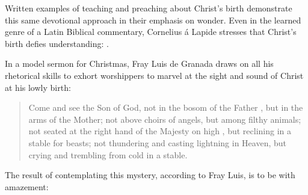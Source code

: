 \documentclass[12pt]{book}
\begin{document}
Written examples of teaching and preaching about Christ's birth demonstrate this
same devotional approach in their emphasis on wonder.
Even in the learned genre of a Latin Biblical commentary, Cornelius á Lapide
stresses that Christ's birth defies understanding: 
.%
    \Autocite
    [50, on Mt 1:15: 
    .]
    {Lapide:Gospels19C}

In a model sermon for Christmas, Fray Luis de Granada draws on all his
rhetorical skills to exhort worshippers to marvel at the sight and sound of
Christ at his lowly birth:
\begin{quote}
    Come and see the Son of God, not in the bosom of the Father , but
    in the arms of the Mother; not above choirs of angels, but among filthy
    animals; not seated at the right hand of the Majesty on high ,
    but reclining in a stable for beasts; not thundering and casting lightning
    in Heaven, but crying and trembling from cold in a stable.
        \Autocite
        [37: .]
        {LuisdeGranada:Xmas}
\end{quote}
The result of contemplating this mystery, according to Fray Luis, is to be
 with amazement:
\end{document}
